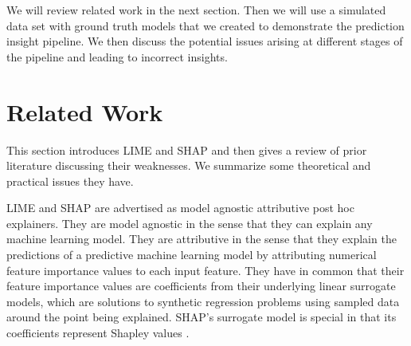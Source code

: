 \documentclass[12pt]{article}    %
\def\pipeline{prediction insight pipeline}
\begin{document}
    We will review related work in the next section. Then we will use a simulated data set with ground truth models that we created to demonstrate the \pipeline. We then discuss the potential issues arising at different stages of the pipeline and leading to incorrect insights.
    
    \vspace{-6mm}
\section*{Related Work}
    \label{sec:relatedwork}
   This section introduces LIME and SHAP and then gives a review of prior literature discussing their weaknesses. We summarize some theoretical and practical issues they have.%
   
        LIME and SHAP are advertised as model agnostic attributive post hoc explainers. They are model agnostic in the sense that they can explain any machine learning model. They are attributive in the sense that they explain the predictions of a predictive machine learning model by attributing numerical feature importance values to each input feature. They have in common that their feature importance values are coefficients from their underlying linear surrogate models, which are solutions to synthetic regression problems using sampled data around the point being explained. SHAP's surrogate model is special in that its coefficients represent Shapley values \citep{shapley97shapley}. %
    
\end{document}
